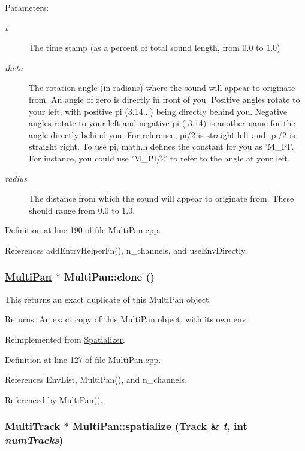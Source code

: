 \begin{Desc}
\item[Parameters:]
\begin{description}
\item[{\em t}]The time stamp (as a percent of total sound length, from 0.0 to 1.0) \item[{\em theta}]The rotation angle (in radians) where the sound will appear to originate from. An angle of zero is directly in front of you. Positive angles rotate to your left, with positive pi (3.14...) being directly behind you. Negative angles rotate to your left and negative pi (-3.14) is another name for the angle directly behind you. For reference, pi/2 is straight left and -pi/2 is straight right. To use pi, math.h defines the constant for you as 'M\_\-PI'. For instance, you could use 'M\_\-PI/2' to refer to the angle at your left. \item[{\em radius}]The distance from which the sound will appear to originate from. These should range from 0.0 to 1.0. \end{description}
\end{Desc}


Definition at line 190 of file Multi\-Pan.cpp.

References add\-Entry\-Helper\-Fn(), n\_\-channels, and use\-Env\-Directly.\hypertarget{classMultiPan_a3}{
\subsubsection[clone]{\setlength{\rightskip}{0pt plus 5cm}\hyperlink{classMultiPan}{Multi\-Pan} $\ast$ Multi\-Pan::clone ()}}
\label{classMultiPan_a3}


This returns an exact duplicate of this Multi\-Pan object. \begin{Desc}
\item[Returns:]An exact copy of this Multi\-Pan object, with its own env \end{Desc}


Reimplemented from \hyperlink{classSpatializer_a1}{Spatializer}.

Definition at line 127 of file Multi\-Pan.cpp.

References Env\-List, Multi\-Pan(), and n\_\-channels.

Referenced by Multi\-Pan().\hypertarget{classMultiPan_a6}{
\subsubsection[spatialize]{\setlength{\rightskip}{0pt plus 5cm}\hyperlink{classMultiTrack}{Multi\-Track} $\ast$ Multi\-Pan::spatialize (\hyperlink{classTrack}{Track} \& {\em t}, int {\em num\-Tracks})}}
\label{classMultiPan_a6}


